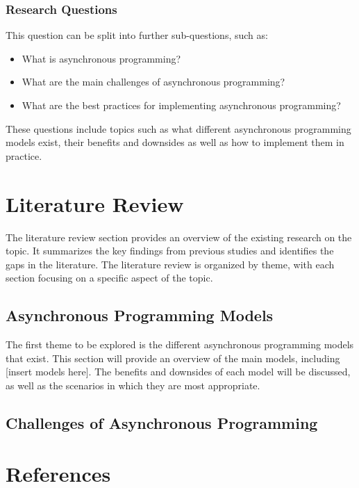 \documentclass{article}
\begin{document}
\subsubsection{Research Questions}

This question can be split into further sub-questions, such as:

\begin{itemize}
    \item What is asynchronous programming?
    \item What are the main challenges of asynchronous programming?
    \item What are the best practices for implementing asynchronous programming?
\end{itemize}

These questions include topics such as what different asynchronous programming models exist, their benefits and downsides as well as how to implement them in practice.

\section{Literature Review}

The literature review section provides an overview of the existing research on the topic. It summarizes the key findings from previous studies and identifies the gaps in the literature. The literature review is organized by theme, with each section focusing on a specific aspect of the topic.

\subsection{Asynchronous Programming Models}

The first theme to be explored is the different asynchronous programming models that exist. This section will provide an overview of the main models, including [insert models here]. The benefits and downsides of each model will be discussed, as well as the scenarios in which they are most appropriate.

\subsection{Challenges of Asynchronous Programming}


\newpage
\section{References}
\printbibliography
\end{document}
